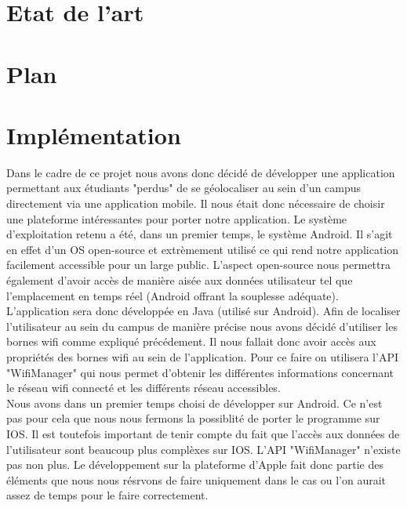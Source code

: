 \documentclass[11pt,a4paper]{article}
\begin{document}
\newpage
\section{Etat de l'art}

\section{Plan}

\section{Implémentation}
Dans le cadre de ce projet nous avons donc décidé de développer une application permettant aux étudiants "perdus" de se géolocaliser au sein d'un campus directement via une application mobile. Il nous était donc nécessaire de choisir une plateforme intéressantes pour porter notre application. Le système d'exploitation retenu a été, dans un premier temps, le système Android. Il s'agit en effet d'un OS open-source et extrèmement utilisé ce qui rend notre application facilement accessible pour un large public. L'aspect open-source nous permettra également d'avoir accès de manière aisée aux données utilisateur tel que l'emplacement en temps réel (Android offrant la souplesse adéquate).\\
L'application sera donc développée en Java (utilisé sur Android). Afin de localiser l'utilisateur au sein du campus de manière précise nous avons décidé d'utiliser les bornes wifi comme expliqué précédement. Il nous fallait donc avoir accès aux propriétés des bornes wifi au sein de l'application. Pour ce faire on utilisera l'API "WifiManager" qui nous permet d'obtenir les différentes informations concernant le réseau wifi connecté et les différents réseau accessibles.\\
Nous avons dans un premier temps choisi de développer sur Android. Ce n'est pas pour cela que nous nous fermons la possiblité de porter le programme sur IOS. Il est toutefois important de tenir compte du fait que l'accès aux données de l'utilisateur sont beaucoup plus complèxes sur IOS. L'API "WifiManager" n'existe pas non plus. Le développement sur la plateforme d'Apple fait donc partie des éléments que nous nous résrvons de faire uniquement dans le cas ou l'on aurait assez de temps pour le faire correctement.
\end{document}
